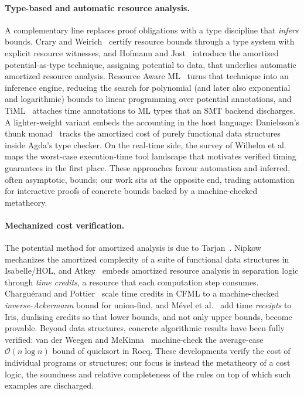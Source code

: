 \documentclass[runningheads]{llncs}
\newcommand{\BigO}{\mathcal{O}}
\begin{document}
\paragraph{Type-based and automatic resource analysis.}
A complementary line replaces proof obligations with a type discipline that
\emph{infers} bounds.
Crary and Weirich~\cite{CraryWeirich2000} certify resource bounds through a type
system with explicit resource witnesses, and Hofmann and
Jost~\cite{HofmannJost2003} introduce the amortized potential-as-type technique,
assigning potential to data, that underlies automatic amortized resource analysis.
Resource Aware ML~\cite{Hoffmann2012,HoffmannDasWeng2017} turns that technique into
an inference engine, reducing the search for polynomial (and later also
exponential and logarithmic) bounds to linear programming over potential
annotations, and TiML~\cite{Wang2017} attaches time annotations to ML types that an
SMT backend discharges.
A lighter-weight variant embeds the accounting in the host language: Danielsson's
thunk monad~\cite{Danielsson2008} tracks the amortized cost of purely functional
data structures inside Agda's type checker.
On the real-time side, the survey of Wilhelm et al.~\cite{Wilhelm2008} maps the
worst-case execution-time tool landscape that motivates verified timing guarantees
in the first place.
These approaches favour automation and inferred, often asymptotic, bounds; our work
sits at the opposite end, trading automation for interactive proofs of concrete
bounds backed by a machine-checked metatheory.

\paragraph{Mechanized cost verification.}
The potential method for amortized analysis is due to Tarjan~\cite{Tarjan1985}.
Nipkow~\cite{Nipkow2015} mechanizes the amortized complexity of a suite of
functional data structures in Isabelle/HOL, and Atkey~\cite{Atkey2010} embeds
amortized resource analysis in separation logic through \emph{time credits}, a
resource that each computation step consumes.
Chargu\'eraud and Pottier~\cite{ChargueraudPottier2019} scale time credits in CFML
to a machine-checked \emph{inverse-Ackermann} bound for union-find, and M\'evel et
al.~\cite{MevelJourdanPottier2019} add time \emph{receipts} to Iris, dualising
credits so that lower bounds, and not only upper bounds, become provable.
Beyond data structures, concrete algorithmic results have been fully verified: van
der Weegen and McKinna~\cite{vanderWeegenMcKinna2008} machine-check the average-case
$\BigO(n\log n)$ bound of quicksort in Rocq.
These developments verify the cost of individual programs or structures; our focus
is instead the metatheory of a cost logic, the soundness and relative completeness
of the rules on top of which such examples are discharged.
\end{document}
